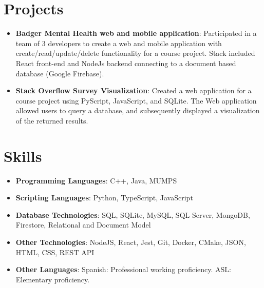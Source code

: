 \documentclass[letterpaper,11pt]{article}
\makeatletter
\newcommand{\resumeItem}[2]{
  \item\small{
    \textbf{#1}{: #2 \vspace{-2pt}}
  }
}
\newcommand{\resumeSubSubheading}[2]{
    \begin{tabular*}{0.97\textwidth}{l@{\extracolsep{\fill}}r}
      \textit{\small#1} & \textit{\small #2} \\
    \end{tabular*}\vspace{-5pt}
}
\newcommand{\resumeSubItem}[2]{\resumeItem{#1}{#2}\vspace{-4pt}}
\newcommand{\resumeSubHeadingListStart}{\begin{itemize}[leftmargin=*]}
\newcommand{\resumeSubHeadingListEnd}{\end{itemize}}
\newcommand{\resumeItemListStart}{\begin{itemize}}
\newcommand{\resumeItemListEnd}{\end{itemize}\vspace{-5pt}}
\makeatother
\begin{document}

\section{Projects}
  \resumeSubHeadingListStart
    \resumeSubItem{Badger Mental Health web and mobile application}
      {Participated in a team of 3 developers to create a web and mobile application with create/read/update/delete functionality for a course project. Stack included React front-end and NodeJs backend connecting to a document based database (Google Firebase).}
    \resumeSubItem{Stack Overflow Survey Visualization}
      {Created a web application for a course project using PyScript, JavaScript, and SQLite. The Web application allowed users to query a database, and subsequently displayed a visualization of the returned results.}
  \resumeSubHeadingListEnd

%

\section{Skills}
  \resumeSubHeadingListStart
    \resumeSubItem{Programming Languages}{C++, Java, MUMPS}
    \resumeSubItem{Scripting Languages}{Python, TypeScript, JavaScript}
    \resumeSubItem{Database Technologies}{SQL, SQLite, MySQL, SQL Server, MongoDB, Firestore, Relational and Document Model}
    \resumeSubItem{Other Technologies}{NodeJS, React, Jest, Git, Docker, CMake, JSON, HTML, CSS, REST API}
    \resumeSubItem{Other Languages}{Spanish: Professional working proficiency. ASL: Elementary proficiency.}
  \resumeSubHeadingListEnd

\end{document}
